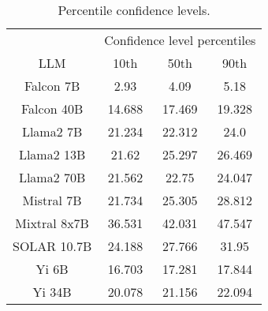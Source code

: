\begin{table*}
\centering
\begin{tabular}{c|c|c|c}
& \multicolumn{3}{c}{Confidence level percentiles} \\ 
LLM & 10th & 50th & 90th\\ \hline
Falcon 7B & 2.93 & 4.09 & 5.18\\
Falcon 40B & 14.688 & 17.469 & 19.328\\
Llama2 7B & 21.234 & 22.312 & 24.0\\
Llama2 13B & 21.62 & 25.297 & 26.469\\
Llama2 70B & 21.562 & 22.75 & 24.047\\
Mistral 7B & 21.734 & 25.305 & 28.812\\
Mixtral 8x7B & 36.531 & 42.031 & 47.547\\
SOLAR 10.7B & 24.188 & 27.766 & 31.95\\
Yi 6B & 16.703 & 17.281 & 17.844\\
Yi 34B & 20.078 & 21.156 & 22.094\\
\hline
\end{tabular}
\caption{Percentile confidence levels.}
\label{tab:percentile_conf}
\end{table*}
